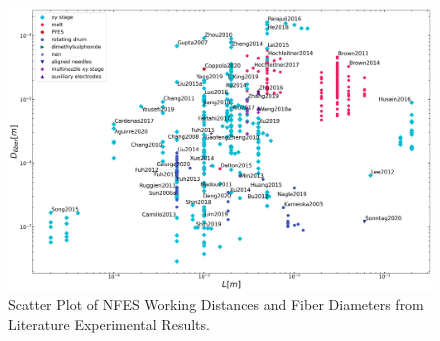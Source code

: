 \begin{figure}[!th]
\centering
\includegraphics[width=\textwidth]{./Figures/plt_Lm_vs_Dfiberm.png}
\decoRule
\caption[Scatter Plot of NFES Working Distances and Fiber Diameters from Literature Experimental Results]{Scatter Plot of NFES Working Distances and Fiber Diameters from Literature Experimental Results. \cite{
  Yang2019,Fattahi2017,Shin2019,Wang2015,Parajuli2016,Zheng2010,Fuh2011,Dalton2015,
  Ru2014,Xue2014,Wang2017,Xu2014,Liu2013,Pan2014,Canton2014,Chakraborty2009,Gupta2007,
  He2018,Zhou2011,Chen2013,Williams2018,Choi2017,Pan2019,Lei2015,Lim2019,Park2020,
  Fuh2012,Flores2017,Chang2010,Xu2019,Zhang2019,Shin2018,Fuh2015,Nagle2019,Zheng2012,
  Kameoka2003a,Liu2014,E.King2019,Hochleitner2017,Madou2011,Jiang2018,Husain2016,
  ElectrospinTech2015,Brown2011,Kolan2018,Chang2011,Beachley2011,Camillo2013,Kameoka2003,
  Bu2012,Lee2012,Huang2015,Coppola2020,CisquellaSerra2019,Ruggieri2013,Hochleitner2014,
  Zhu2016,Brown2014,Chang2008,Sonntag2020,Kim2018,Deng2020,Han2019,George2020,Sun2006a,
  Pan2015,Shen2016,Strauss2019,Fuh2013,Sarkar2007,You2017,Wang2018a,Zheng2014,Song2015,
  GaofengZheng2010,Liu2015a,Min2013,Luo2016,Yousefi2019,Cardenas2017,Coppola2014}}
\label{fig:plt_Lm_vs_Dfiberm}
\end{figure}

